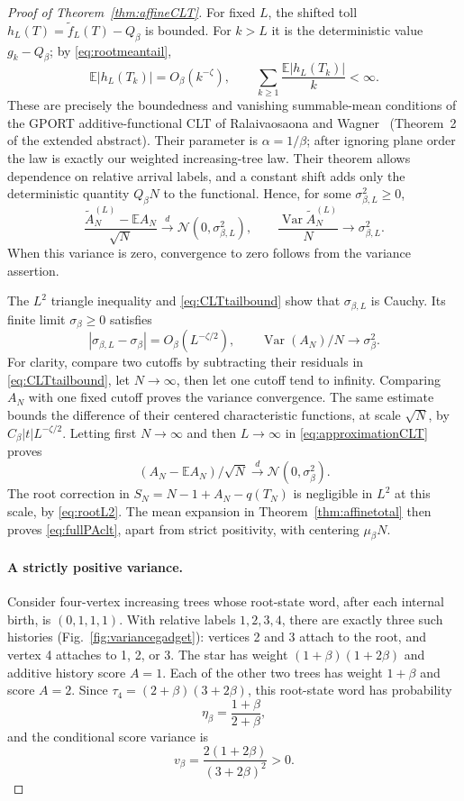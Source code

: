 \documentclass[runningheads,envcountsame,orivec]{llncs}
\newcommand{\E}{\mathbb E}
\begin{document}
\begin{proof}[Proof of Theorem~\ref{thm:affineCLT}]
For fixed $L$, the shifted toll
$h_L(T)=\widetilde f_L(T)-Q_\beta$ is bounded. For $k>L$ it is
the deterministic value $g_k-Q_\beta$; by
\eqref{eq:rootmeantail},
\[
 \E|h_L(T_k)|=O_\beta(k^{-\zeta}),\qquad
 \sum_{k\ge1}\frac{\E|h_L(T_k)|}{k}<\infty.
\]
These are precisely the boundedness and vanishing summable-mean
conditions of the GPORT additive-functional CLT of
Ralaivaosaona and Wagner~\cite{RalaivaosaonaWagner2019}
(Theorem~2 of the extended abstract). Their parameter is
$\alpha=1/\beta$; after ignoring plane order the law is exactly
our weighted increasing-tree law. Their theorem allows dependence on
relative arrival labels, and a constant shift adds only the
deterministic quantity $Q_\beta N$ to the functional. Hence, for
some $\sigma_{\beta,L}^2\ge0$,
\begin{equation}\label{eq:approximationCLT}
 \frac{\widetilde A_N^{(L)}-\E A_N}{\sqrt N}
 \xrightarrow{d}\mathcal N(0,\sigma_{\beta,L}^2),\qquad
 \frac{\operatorname{Var}\widetilde A_N^{(L)}}N
 \longrightarrow\sigma_{\beta,L}^2.
\end{equation}
When this variance is zero, convergence to zero follows from the
variance assertion.

The $L^2$ triangle inequality and \eqref{eq:CLTtailbound} show
that $\sigma_{\beta,L}$ is Cauchy. Its finite limit
$\sigma_\beta\ge0$ satisfies
\begin{equation}\label{eq:varianceapproximationrate}
 |\sigma_{\beta,L}-\sigma_\beta|
 =O_\beta(L^{-\zeta/2}),\qquad
 \operatorname{Var}(A_N)/N\longrightarrow\sigma_\beta^2.
\end{equation}
For clarity, compare two cutoffs by subtracting their residuals in
\eqref{eq:CLTtailbound}, let $N\to\infty$, then let one cutoff
tend to infinity. Comparing $A_N$ with one fixed cutoff proves the
variance convergence. The same estimate bounds the difference of
their centered characteristic functions, at scale $\sqrt N$, by
$C_\beta|t|L^{-\zeta/2}$. Letting first $N\to\infty$ and then
$L\to\infty$ in \eqref{eq:approximationCLT} proves
\[
 (A_N-\E A_N)/\sqrt N\xrightarrow{d}
 \mathcal N(0,\sigma_\beta^2).
\]
The root correction in $S_N=N-1+A_N-q(T_N)$ is negligible in
$L^2$ at this scale, by \eqref{eq:rootL2}. The mean expansion in
Theorem~\ref{thm:affinetotal} then proves \eqref{eq:fullPAclt},
apart from strict positivity, with centering $\mu_\beta N$.

\paragraph{A strictly positive variance.}
Consider four-vertex increasing trees whose root-state word, after
each internal birth, is $(0,1,1,1)$. With relative labels $1,2,3,4$,
there are exactly three such histories (Fig.~\ref{fig:variancegadget}): vertices 2 and 3 attach to
the root, and vertex 4 attaches to 1, 2, or 3. The star has weight
$(1+\beta)(1+2\beta)$ and additive history score $A=1$.
Each of the other two trees has weight $1+\beta$ and score $A=2$.
Since $\tau_4=(2+\beta)(3+2\beta)$, this root-state word has
probability
\[
 \eta_\beta=\frac{1+\beta}{2+\beta},
\]
and the conditional score variance is
\[
 v_\beta=\frac{2(1+2\beta)}{(3+2\beta)^2}>0.
\]


\end{proof}
\end{document}
